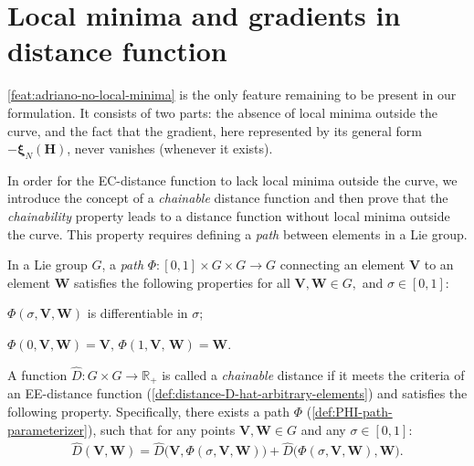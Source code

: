 \section{Local minima and gradients in distance function}
\cref{feat:adriano-no-local-minima} is the only feature remaining to be present in our formulation. It consists of two parts: the absence of local minima outside the curve, and the fact that the gradient, here represented by its general form $-\boldsymbol{\xi}_N(\mathbf{H})$, never vanishes (whenever it exists).

In order for the EC-distance function to lack local minima outside the curve, we introduce the concept of a \emph{chainable} distance function and then prove that the \emph{chainability} property leads to a distance function without local minima outside the curve. This property requires defining a \emph{path} between elements in a Lie group.
\begin{definition}[Path]\label{def:PHI-path-parameterizer}
    In a Lie group $G$, a \emph{path} $\Phi:[0, 1] \times G \times G \to G$ connecting an element $\mathbf{V}$ to an element $\mathbf{W}$ satisfies the following properties for all $\mathbf{V}, \mathbf{W}\in G,$ and $\sigma\in[0,1]$:
    \begin{property}
        \item $\Phi(\sigma, \mathbf{V}, \mathbf{W})$ is differentiable in $\sigma$;\label{prop:path-continuous}
        \item $\Phi(0, \mathbf{V}, \mathbf{W}) = \mathbf{V},\,\Phi(1, \mathbf{V},\, \mathbf{W}) = \mathbf{W}$.\label{prop:path-initUfinalV}
    \end{property}
\end{definition}

\begin{definition}\label{def:chainable-distance}
    A function $\widehat{D}: G \times G \to \mathbb{R}_+$ is called a \emph{chainable} distance if it meets the criteria of an EE-distance function (\cref{def:distance-D-hat-arbitrary-elements}) and satisfies the following property. Specifically, there exists a path $\Phi$ (\cref{def:PHI-path-parameterizer}), such that for any points $\mathbf{V}, \mathbf{W} \in G$ and any $\sigma \in [0,1]$:
    \begin{align*}
        \widehat{D}(\mathbf{V}, \mathbf{W}) = \widehat{D}\bigl(\mathbf{V}, \Phi(\sigma, \mathbf{V}, \mathbf{W})\bigr) + \widehat{D}\bigl(\Phi(\sigma, \mathbf{V}, \mathbf{W}), \mathbf{W} \bigr).
    \end{align*}
\end{definition}

